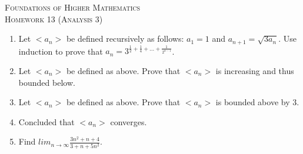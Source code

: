 \documentclass{article}
\theoremstyle{problem}
\theoremstyle{plain}
\theoremstyle{remark}
\begin{document}
\begin{center}
  \textsc{\Large Foundations of Higher Mathematics}\\[.3cm]
  \textsc{\Large Homework 13 (Analysis 3)}
\end{center}

\begin{enumerate}
\item Let $<a_n>$ be defined recursively as follows: $a_1 = 1$ and $a_{n+1} = \sqrt{3a_n}$. Use induction to prove that $a_n = 3^{\frac{1}{2} + \frac{1}{4} + \ldots + \frac{1}{2^{n-1}}}$.
\item Let $<a_n>$ be defined as above. Prove that $<a_n>$ is increasing and thus bounded below.
\item Let $<a_n>$ be defined as above. Prove that $<a_n>$ is bounded above by 3.
\item Concluded that $<a_n>$ converges.
\item Find $\displaystyle lim_{n \to \infty} \frac{3n^2+n+4}{3 + n + 5n^2}$.
\end{enumerate}
\end{document}
